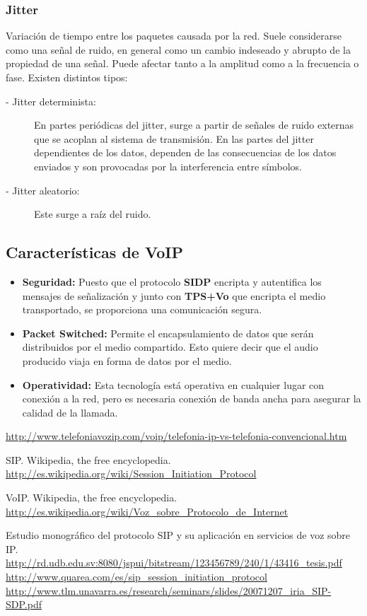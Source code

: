 \documentclass[a4paper, 11pt]{article} %
\begin{document}
		\subsubsection{Jitter} \label{jitter}
			Variación de tiempo entre los paquetes causada por la red. Suele considerarse como una señal de ruido, en general como un cambio indeseado y abrupto de la propiedad de una señal. Puede afectar tanto a la amplitud como a la frecuencia o fase.
			Existen distintos tipos:
			\begin{description}
				\item[- Jitter determinista:] En partes periódicas del jitter, surge a partir de señales de ruido externas que se acoplan al sistema de transmisión. En las partes del jitter dependientes de los datos, dependen de las consecuencias de los datos enviados y son provocadas por la interferencia entre símbolos.
				\item[- Jitter aleatorio:] Este surge a raíz del ruido.
			\end{description}
			
		\subsection{Características de VoIP}
		\begin{itemize}
			\item \textbf{Seguridad:} Puesto que el protocolo \textbf{SIDP} encripta y autentifica los mensajes de señalización y junto con \textbf{TP{S+Vo}} que encripta el medio transportado, se proporciona una comunicación segura.
			\item \textbf{Packet Switched:} Permite el encapsulamiento de datos que serán distribuidos por el medio compartido. Esto quiere decir que el audio producido viaja en forma de datos por el medio.
			\item \textbf{Operatividad:} Esta tecnología está operativa en cualquier lugar con conexión a la red, pero es necesaria conexión de banda ancha para asegurar la calidad de la llamada.
		\end{itemize}

\newpage
	\begin{thebibliography}{10}
		\url{http://www.telefoniavozip.com/voip/telefonia-ip-vs-telefonia-convencional.htm}
	
		SIP. Wikipedia, the free encyclopedia.\\
		\url{http://es.wikipedia.org/wiki/Session_Initiation_Protocol}
	
		VoIP. Wikipedia, the free encyclopedia.\\
		\url{http://es.wikipedia.org/wiki/Voz_sobre_Protocolo_de_Internet}
		
		Estudio monográfico del protocolo SIP y su aplicación en servicios de voz sobre IP.\\
		\url{http://rd.udb.edu.sv:8080/jspui/bitstream/123456789/240/1/43416_tesis.pdf}
		\url{http://www.quarea.com/es/sip_session_initiation_protocol}
		\url{http://www.tlm.unavarra.es/research/seminars/slides/20071207_iria_SIP-SDP.pdf}
	\end{thebibliography}
\end{document}
